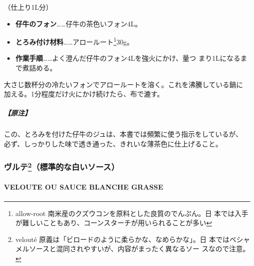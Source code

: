 \begin{recette}

（仕上り1L分）

\begin{itemize}
\item
  \textbf{仔牛のフォン}\ldots{}\ldots{}仔牛の茶色いフォン4L。
\item
  \textbf{とろみ付け材料}\ldots{}\ldots{}アロールート\footnote{allow-root
    南米産のクズウコンを原料とした良質のでんぷん。日
    本では入手が難しいこともあり、コーンスターチが用いられることが多い}30g。
\item
  \textbf{作業手順}\ldots{}\ldots{}よく澄んだ仔牛のフォン4Lを強火にかけ、\unquart{}量つ
  まり1Lになるまで煮詰める。
\end{itemize}

大さじ数杯分の冷たいフォンでアロールートを溶く。これを沸騰している鍋に
加える。1分程度だけ火にかけ続けたら、布で漉す。

\hypertarget{ux539fux6ce8-2}{%
\subparagraph{【原注】}\label{ux539fux6ce8-2}}

この、とろみを付けた仔牛のジュは、本書では頻繁に使う指示をしているが、
必ず、しっかりした味で透き通った、きれいな薄茶色に仕上げること。

\maeaki

\hypertarget{ux30f4ux30ebux30c6102013ux6a19ux6e96ux7684ux306aux767dux3044ux30bdux30fcux30b9}{%
\subsubsection[ヴルテ（標準的な白いソース）]{\texorpdfstring{ヴルテ\footnote{velouté
  原義は「ビロードのように柔らかな、なめらかな」。日
  本ではベシャメルソースと混同されやすいが、内容がまったく異なるソー
  スなので注意。}（標準的な白いソース）}{ヴルテ（標準的な白いソース）}}\label{ux30f4ux30ebux30c6102013ux6a19ux6e96ux7684ux306aux767dux3044ux30bdux30fcux30b9}}

\hypertarget{veloute}{%
\paragraph{VELOUTE OU SAUCE BLANCHE GRASSE}\label{veloute}}


\end{recette}
